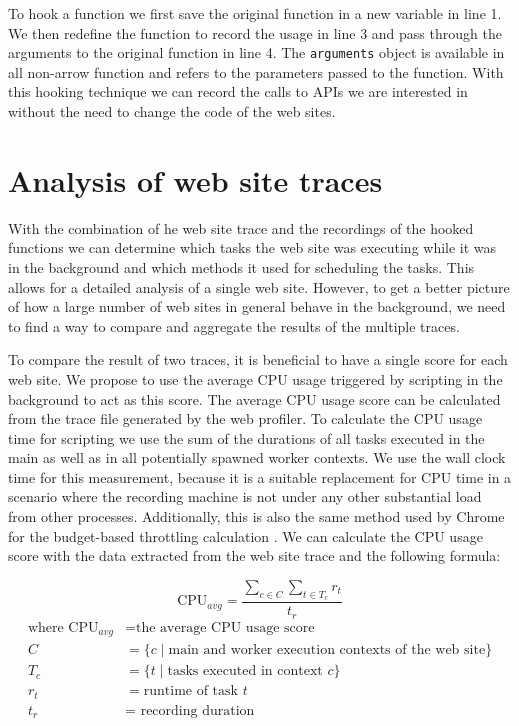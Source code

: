 \documentclass[
	ruledheaders=section,%
	class=report,%
	thesis={type=bachelor},%
	accentcolor=9c,%
	custommargins=true,%
	marginpar=false,%
	parskip=half-,%
	fontsize=11pt,%
]{tudapub}
\begin{document}
  To hook a function we first save the original function in a new variable in line 1. We then redefine the function to record the usage in line 3 and pass through the arguments to the original function in line 4. The \texttt{arguments} object is available in all non-arrow function and refers to the parameters passed to the function. With this hooking technique we can record the calls to APIs we are interested in without the need to change the code of the web sites.

  \section{Analysis of web site traces}
  \label{sec:trace-analysis}

  With the combination of he web site trace and the recordings of the hooked functions we can determine which tasks the web site was executing while it was in the background and which methods it used for scheduling the tasks. This allows for a detailed analysis of a single web site. However, to get a better picture of how a large number of web sites in general behave in the background, we need to find a way to compare and aggregate the results of the multiple traces.

  To compare the result of two traces, it is beneficial to have a single score for each web site. We propose to use the average CPU usage triggered by scripting in the background to act as this score. The average CPU usage score can be calculated from the trace file generated by the web profiler. To calculate the CPU usage time for scripting we use the sum of the durations of all tasks executed in the main as well as in all potentially spawned worker contexts. We use the wall clock time for this measurement, because it is a suitable replacement for CPU time in a scenario where the recording machine is not under any other substantial load from other processes. Additionally, this is also the same method used by Chrome for the budget-based throttling calculation \cite{chrome-background-tabs}. We can calculate the CPU usage score with the data extracted from the web site trace and the following formula:

  \begin{equation*}
    \text{CPU}_{avg} = \frac{ \sum_{ c \in C } \sum_{ t \in T_c } r_t }{ t_r }
  \end{equation*}
  \begin{align*}
    \text{where CPU}_{avg} &= \text{the average CPU usage score} \\
    C &= \{ c \mid \text{main and worker execution contexts of the web site} \} \\
    T_c &= \{ t \mid \text{tasks executed in context } c \} \\
    r_t &= \text{runtime of task } t \\
    t_r &= \text{ recording duration }
  \end{align*}
\end{document}
